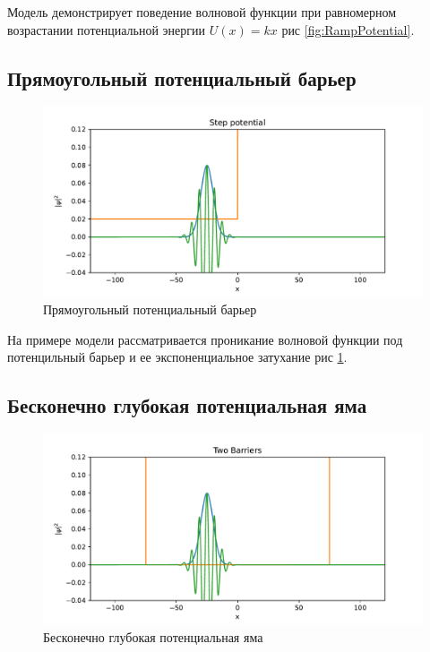 \documentclass[a4paper, 12pt]{article}
\begin{document}
    Модель демонстрирует поведение волновой функции при равномерном возрастании потенциальной энергии $U(x) = kx$ рис 
    \ref{fig:RampPotential}.
    
    \subsection{Прямоугольный потенциальный барьер}

    \begin{figure}
        \centering
        \includegraphics[scale=0.5]{images/StepPotential.pdf}
        \caption{Прямоугольный потенциальный барьер}
        \label{fig:StepPotential}
    \end{figure}

    На примере модели рассматривается проникание волновой функции под потенцильный барьер и ее экспоненциальное затухание рис 
    \ref{fig:StepPotential}.
    
    \subsection{Бесконечно глубокая потенциальная яма}

    \begin{figure}
        \centering
        \includegraphics[scale=0.5]{images/TwoBarriers.pdf}
        \caption{Бесконечно глубокая потенциальная яма}
        \label{fig:TwoBarriers}
    \end{figure}
\end{document}

